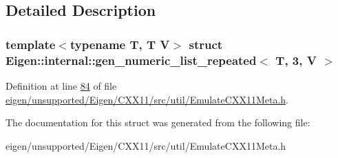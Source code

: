 \subsection{Detailed Description}
\subsubsection*{template$<$typename T, T V$>$\newline
struct Eigen\+::internal\+::gen\+\_\+numeric\+\_\+list\+\_\+repeated$<$ T, 3, V $>$}



Definition at line \hyperlink{eigen_2unsupported_2_eigen_2_c_x_x11_2src_2util_2_emulate_c_x_x11_meta_8h_source_l00084}{84} of file \hyperlink{eigen_2unsupported_2_eigen_2_c_x_x11_2src_2util_2_emulate_c_x_x11_meta_8h_source}{eigen/unsupported/\+Eigen/\+C\+X\+X11/src/util/\+Emulate\+C\+X\+X11\+Meta.\+h}.



The documentation for this struct was generated from the following file\+:\begin{DoxyCompactItemize}
\item 
eigen/unsupported/\+Eigen/\+C\+X\+X11/src/util/\+Emulate\+C\+X\+X11\+Meta.\+h\end{DoxyCompactItemize}
